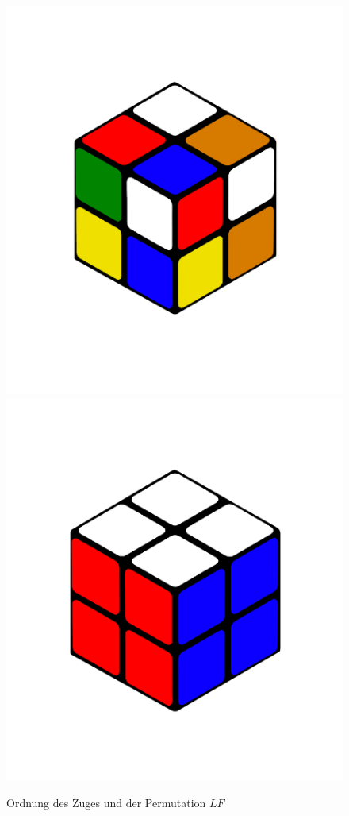\documentclass[12pt,a4paper, usenames, dvipsnames]{article}
\theoremstyle{mystyle}
\theoremstyle{definition}
\begin{document}
\begin{figure}[H]
\centering
\includegraphics[scale=0.14]{LLFF_5.png}
\includegraphics[scale=0.14]{2x2solved.png}
\caption{Ordnung des Zuges und der Permutation $LF$}
\label{Abbildung_LF_5_15}
\end{figure}
\end{document}
